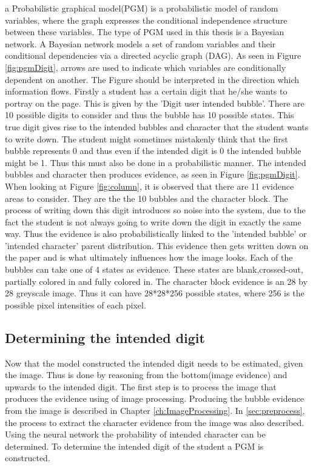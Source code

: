 a Probabilistic graphical model(PGM) is a probabilistic model of random variables, where the graph expresses the conditional independence structure between these variables. The type of PGM used in this thesis is a Bayesian network. A Bayesian network models a set of random variables and their conditional dependencies via a directed acyclic graph (DAG). As seen in Figure \ref{fig:pgmDigit}, arrows are used to indicate which variables are conditionally dependent on another. The Figure should be interpreted in the direction which information flows. Firstly a student has a certain digit that he/she wants to portray on the page. This is given by the 'Digit user intended bubble'. There are 10 possible digits to consider and thus the bubble has 10 possible states. This true digit gives rise to the intended bubbles and character that the student wants to write down. The student might sometimes mistakenly think that the first bubble represents 0 and thus even if the intended digit is 0 the intended bubble might be 1. Thus this must also be done in a probabilistic manner. The intended bubbles and character then produces evidence, as seen in Figure \ref{fig:pgmDigit}.  When looking at Figure \ref{fig:column}, it is observed that there are 11 evidence areas to consider. They are the the 10 bubbles and the character block. The process of writing down this digit introduces so noise into the system, due to the fact the student is not always going to write down the digit in exactly the same way. Thus the evidence is also probabilistically linked to the 'intended bubble' or 'intended character' parent distribution. This evidence then gets written down on the paper and is what ultimately influences how the image looks. Each of the bubbles can take one of 4 states as evidence. These states are blank,crossed-out, partially colored in and fully colored in. The character block evidence is an 28 by 28 greyscale image. Thus it can have 28*28*256 possible states, where 256 is the possible pixel intensities of each pixel.

\subsection{Determining the intended digit}
Now that the model constructed the intended digit needs to be estimated, given the image. Thus is done by reasoning from the bottom(image evidence) and upwards to the intended digit. The first step is to process the image that produces the evidence using of image processing. Producing the bubble evidence from the image is described in Chapter \ref{ch:ImageProcessing}. In \ref{sec:preprocess}, the process to extract the character evidence from the image was also described. Using the neural network the probability of intended character can be determined. To determine the intended digit of the student a PGM is constructed.

